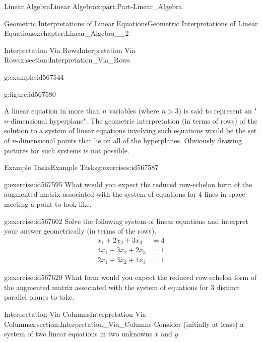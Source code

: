 \documentclass[oneside,10pt,]{book}
\numberwithin{equation}{section}
\newcommand{\gt}{>}
\newcommand{\amp}{&}
\begin{document}
\begin{partptx}{Linear Algebra}{}{Linear Algebra}{}{}{x:part:Part-Linear_Algebra}
\begin{chapterptx}{Geometric Interpretations of Linear Equations}{}{Geometric Interpretations of Linear Equations}{}{}{x:chapter:Linear_Algebra__2}
\begin{sectionptx}{Interpretation Via Rows}{}{Interpretation Via Rows}{}{}{x:section:Interpretation_Via_Rows}
\begin{example}{}{g:example:id567544}
\begin{figureptx}{}{g:figure:id567580}{}
\begin{image}{0.2}{0.6}{0.2}
\end{image}%
\tcblower
\end{figureptx}%
%
\end{example}
A linear equation in more than \(n\) variables (where \(n\gt 3\)) is said to represent an "\(n\)-dimensional hyperplane". The geometric interpretation (in terms of rows) of the solution to a system of linear equations involving such equations would be the set of \(n\)-dimensional points that lie on all of the hyperplanes. Obviously drawing pictures for such systems is not possible.%
%
%
\typeout{************************************************}
\typeout{************************************************}
%
\begin{exercises-subsection-numberless}{Example Tasks}{}{Example Tasks}{}{}{g:exercises:id567587}
\begin{divisionexercise}{1}{}{}{g:exercise:id567595}%
What would you expect the reduced row-echelon form of the augmented matrix associated with the system of equations for \(4\) lines in space meeting a point to look like.%
\end{divisionexercise}%
\begin{divisionexercise}{2}{}{}{g:exercise:id567602}%
Solve the following system of linear equations and interpret your answer geometrically (in terms of the rows).%
\begin{align*}
x_1+2x_2+3x_3 \amp=4\\
4x_1+3x_2+2x_3 \amp=1\\
2x_1+3x_2+4x_3 \amp =1
\end{align*}
%
\end{divisionexercise}%
\begin{divisionexercise}{3}{}{}{g:exercise:id567620}%
What form would you expect the reduced row-echelon form of the augmented matrix associated with the system of equations for \(3\) distinct parallel planes to take.%
\end{divisionexercise}%
\end{exercises-subsection-numberless}
\end{sectionptx}
%
%
\typeout{************************************************}
\typeout{************************************************}
%
\begin{sectionptx}{Interpretation Via Columns}{}{Interpretation Via Columns}{}{}{x:section:Interpretation_Via_Columns}
Consider (initially at least) a system of two linear equations in two unknowns \(x\) and \(y\)%

\end{sectionptx}
\end{chapterptx}
\end{partptx}
\end{document}
